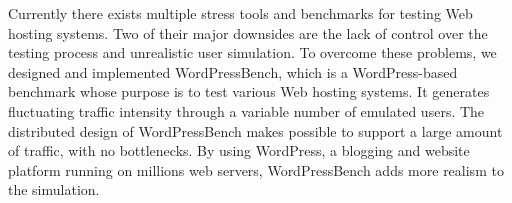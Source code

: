 
Currently there exists multiple stress tools and benchmarks for testing Web hosting systems. Two of their major downsides are the lack of control over the testing process and unrealistic user simulation. To overcome these problems, we designed and implemented WordPressBench, which is a WordPress-based benchmark whose purpose is to test various Web hosting systems. It generates fluctuating traffic intensity through a variable number of emulated users. The distributed design of WordPressBench makes possible to support a large amount of traffic, with no bottlenecks. By using WordPress, a blogging and website platform running on millions web servers, WordPressBench adds more realism to the simulation.
